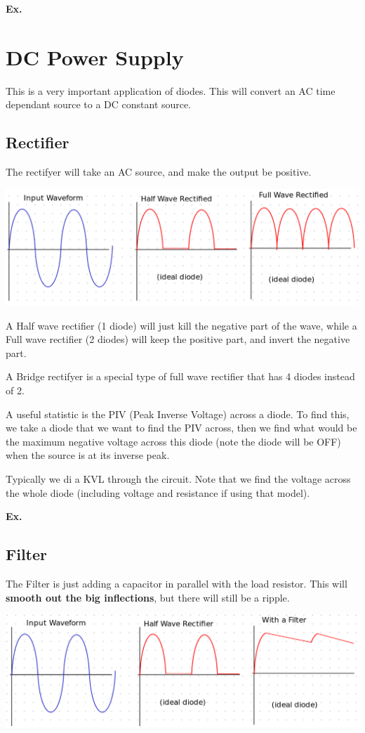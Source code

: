 \documentclass[12pt,letterpaper]{article} \usepackage{amsmath} \usepackage{graphicx} \usepackage[margin=1in]{geometry} \usepackage{longtable}  \usepackage{amssymb}
\begin{document}
	\begin{mdframed}[]
	\textbf{Ex. }
	\end{mdframed}
	
	\section{DC Power Supply}
	This is a very important application of diodes. This will convert an AC time dependant source to a DC constant source. 
	
	\subsection{Rectifier}
	The rectifyer will take an AC source, and make the output be positive.
	\begin{center}
		\includegraphics[width=0.9\linewidth]{rectifier}
	\end{center}
	
	
	A Half wave rectifier (1 diode) will just kill the negative part of the wave, while a Full wave rectifier (2 diodes) will keep the positive part, and invert the negative part. 
	
	A Bridge rectifyer is a special type of full wave rectifier that has 4 diodes instead of 2. 
	
	A useful statistic is the PIV (Peak Inverse Voltage) across a diode. To find this, we take a diode that we want to find the PIV across, then we find what would be the maximum negative voltage across this diode (note the diode will be OFF) when the source is at its inverse peak. 
	
	Typically we di a KVL through the circuit. Note that we find the voltage across the whole diode (including voltage and resistance if using that model).
	
	\begin{mdframed}[]
	\textbf{Ex. }
	\end{mdframed}
	
	\subsection{Filter}
	The Filter is just adding a capacitor in parallel with the load resistor. This will \textbf{smooth out the big inflections}, but there will still be a ripple. 
	\begin{center}
		\includegraphics[width=0.9\linewidth]{filter}
	\end{center}
\end{document}
